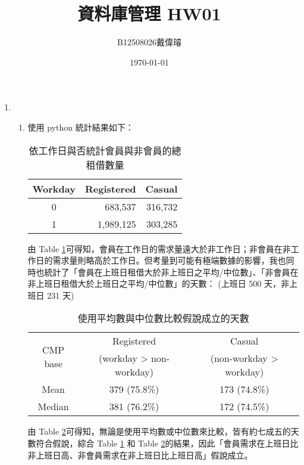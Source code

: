 \documentclass[12pt,a4paper]{article}
\title{資料庫管理 HW01}
\author{B12508026戴偉璿}
\date{\today}
\begin{document}
\maketitle

\newpage

\begin{enumerate}
    \item
    \begin{enumerate}
        \item 使用 python 統計結果如下：
        \begin{table}[H]
        \centering
        \begin{tabular}{c rr}
        \toprule
        Workday & Registered & Casual \\
        \midrule
        0 & 683,537  & 316,732 \\
        1 & 1,989,125 & 303,285 \\
        \bottomrule
        \end{tabular}
        \caption{依工作日與否統計會員與非會員的總租借數量}
        \label{tab:workday_total}
        \end{table}
        由 Table \ref{tab:workday_total}可得知，會員在工作日的需求量遠大於非工作日；非會員在非工作日的需求量則略高於工作日。但考量到可能有極端數據的影響，我也同時也統計了「會員在上班日租借大於非上班日之平均/中位數」、「非會員在非上班日租借大於上班日之平均/中位數」的天數： (上班日 500 天，非上班日 231 天)
        \begin{table}[H]
        \centering
        \begin{tabular}{c cc}
        \toprule
        \multirow{2}{*}{CMP base} & Registered & Casual \\
        & (workday > non-workday) & (non-workday > workday) \\
        \midrule
        Mean   & 379 (75.8\%) & 173 (74.8\%) \\
        Median & 381 (76.2\%) & 172 (74.5\%) \\
        \bottomrule
        \end{tabular}
        \caption{使用平均數與中位數比較假說成立的天數}
        \label{tab:cmp_days}
        \end{table}
        由 Table \ref{tab:cmp_days}可得知，無論是使用平均數或中位數來比較，皆有約七成五的天數符合假說，綜合 Table \ref{tab:workday_total} 和 Table \ref{tab:cmp_days}的結果，因此「會員需求在上班日比非上班日高、非會員需求在非上班日比上班日高」假說成立。


\end{enumerate}
\end{enumerate}
\end{document}

